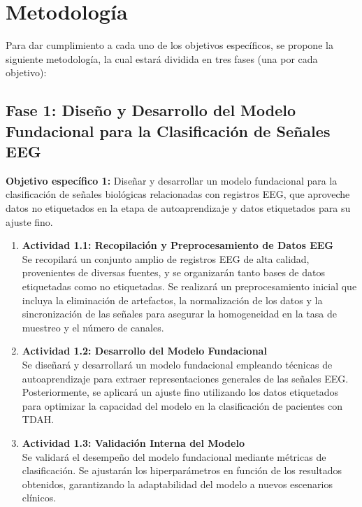 \section{Metodología}

Para dar cumplimiento a cada uno de los objetivos específicos, se propone la siguiente metodología, la cual estará dividida en tres fases (una por cada objetivo):

\subsection*{Fase 1: Diseño y Desarrollo del Modelo Fundacional para la Clasificación de Señales EEG}
\textbf{Objetivo específico 1:} Diseñar y desarrollar un modelo fundacional para la clasificación de señales biológicas relacionadas con registros EEG, que aproveche datos no etiquetados en la etapa de autoaprendizaje y datos etiquetados para su ajuste fino.

\begin{enumerate}
	\item \textbf{Actividad 1.1: Recopilación y Preprocesamiento de Datos EEG}\\
	Se recopilará un conjunto amplio de registros EEG de alta calidad, provenientes de diversas fuentes, y se organizarán tanto bases de datos etiquetadas como no etiquetadas. Se realizará un preprocesamiento inicial que incluya la eliminación de artefactos, la normalización de los datos y la sincronización de las señales para asegurar la homogeneidad en la tasa de muestreo y el número de canales.
	
	\item \textbf{Actividad 1.2: Desarrollo del Modelo Fundacional}\\
	Se diseñará y desarrollará un modelo fundacional empleando técnicas de autoaprendizaje para extraer representaciones generales de las señales EEG. Posteriormente, se aplicará un ajuste fino utilizando los datos etiquetados para optimizar la capacidad del modelo en la clasificación de pacientes con TDAH.
	
	\item \textbf{Actividad 1.3: Validación Interna del Modelo}\\
	Se validará el desempeño del modelo fundacional mediante métricas de clasificación. Se ajustarán los hiperparámetros en función de los resultados obtenidos, garantizando la adaptabilidad del modelo a nuevos escenarios clínicos.
\end{enumerate}

